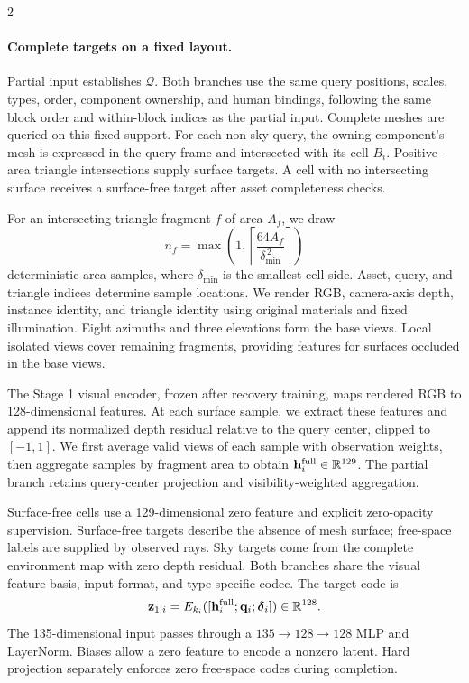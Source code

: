 \begin{multicols}{2}


\paragraph{Complete targets on a fixed layout.}
Partial input establishes $\mathcal Q$. Both branches use the same query positions, scales, types, order, component ownership, and human bindings, following the same block order and within-block indices as the partial input. Complete meshes are queried on this fixed support. For each non-sky query, the owning component's mesh is expressed in the query frame and intersected with its cell $B_i$. Positive-area triangle intersections supply surface targets. A cell with no intersecting surface receives a surface-free target after asset completeness checks.

For an intersecting triangle fragment $f$ of area $A_f$, we draw
\begin{equation}
n_f=\max\!\left(1,\left\lceil\frac{64A_f}{\delta_{\min}^{\,2}}\right\rceil\right)
\label{eq:target-samples}
\end{equation}
deterministic area samples, where $\delta_{\min}$ is the smallest cell side. Asset, query, and triangle indices determine sample locations. We render RGB, camera-axis depth, instance identity, and triangle identity using original materials and fixed illumination. Eight azimuths and three elevations form the base views. Local isolated views cover remaining fragments, providing features for surfaces occluded in the base views.

The Stage 1 visual encoder, frozen after recovery training, maps rendered RGB to 128-dimensional features. At each surface sample, we extract these features and append its normalized depth residual relative to the query center, clipped to $[-1,1]$. We first average valid views of each sample with observation weights, then aggregate samples by fragment area to obtain $\mathbf h_i^{\rm full}\in\mathbb R^{129}$. The partial branch retains query-center projection and visibility-weighted aggregation.

Surface-free cells use a 129-dimensional zero feature and explicit zero-opacity supervision. Surface-free targets describe the absence of mesh surface; free-space labels are supplied by observed rays. Sky targets come from the complete environment map with zero depth residual. Both branches share the visual feature basis, input format, and type-specific codec. The target code is
\begin{equation}
\mathbf z_{1,i}=E_{k_i}([\mathbf h_i^{\rm full};\mathbf q_i;\boldsymbol\delta_i])
\in\mathbb R^{128}.
\label{eq:complete-code}
\end{equation}
The 135-dimensional input passes through a $135\rightarrow128\rightarrow128$ MLP and LayerNorm. Biases allow a zero feature to encode a nonzero latent. Hard projection separately enforces zero free-space codes during completion.

\end{multicols}
